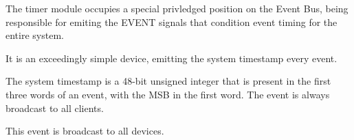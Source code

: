 The timer module occupies a special privledged position on the Event Bus, being responsible for emiting the EVENT signals that condition event timing for the entire system. 

It is an exceedingly simple device, emitting the system timestamp every event.

The system timestamp is a 48-bit unsigned integer that is present in
the first three words of an event, with the MSB in the first word. The
event is always broadcast to all clients.

This event is broadcast to all devices. 

